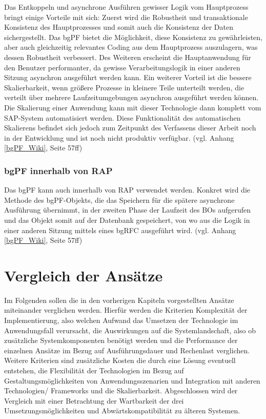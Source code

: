 Das Entkoppeln und asynchrone Ausführen gewisser Logik vom Hauptprozess bringt einige Vorteile mit sich: Zuerst wird die Robustheit und transaktionale Konsistenz des Hauptprozesses und somit auch die Konsistenz der Daten sichergestellt. Das bgPF bietet die Möglichkeit, diese Konsistenz zu gewährleisten, aber auch gleichzeitig relevantes Coding aus dem Hauptprozess auszulagern, was dessen Robustheit verbessert. Des Weiteren erscheint die Hauptanwendung für den Benutzer performanter, da gewisse Verarbeitungslogik in einer anderen Sitzung asynchron ausgeführt werden kann. Ein weiterer Vorteil ist die bessere Skalierbarkeit, wenn grö{\ss}ere Prozesse in kleinere Teile unterteilt werden, die verteilt über mehrere Laufzeitumgebungen asynchron ausgeführt werden können. Die Skalierung einer Anwendung kann mit dieser Technologie dann komplett vom SAP-System automatisiert werden. Diese Funktionalität des automatischen Skalierens befindet sich jedoch zum Zeitpunkt des Verfassens dieser Arbeit noch in der Entwicklung und ist noch nicht produktiv verfügbar. (vgl. Anhang \ref{bgPF_Wiki}, Seite 57ff)

\subsubsection{bgPF innerhalb von RAP}

Das bgPF kann auch innerhalb von RAP verwendet werden. 
Konkret wird die Methode des bgPF-Objekts, die das Speichern für die spätere asynchrone Ausführung übernimmt, in der zweiten Phase der Laufzeit des BOs aufgerufen und das Objekt somit auf der Datenbank gespeichert, von wo aus die Logik in einer anderen Sitzung mittels eines bgRFC ausgeführt wird. (vgl. Anhang \ref{bgPF_Wiki}, Seite 57ff)

\section{Vergleich der Ansätze}

Im Folgenden sollen die in den vorherigen Kapiteln vorgestellten Ansätze miteinander verglichen werden. Hierfür werden die Kriterien Komplexität der Implementierung, also welchen Aufwand das Umsetzen der Technologie im Anwendungsfall verursacht, die Auswirkungen auf die Systemlandschaft, also ob zusätzliche Systemkomponenten benötigt werden und die Performance der einzelnen Ansätze im Bezug auf Ausführungsdauer und Rechenlast verglichen. Weitere Kriterien sind zusätzliche Kosten die durch eine Lösung eventuell entstehen, die Flexibilität der Technologien im Bezug auf Gestaltungsmöglichkeiten von Anwendungsszenarien und Integration mit anderen Technologien/ Frameworks und die Skalierbarkeit. Abgeschlossen wird der Vergleich mit einer Betrachtung der Wartbarkeit der drei Umsetzungsmöglichkeiten und Abwärtskompatibilität zu älteren Systemen.

